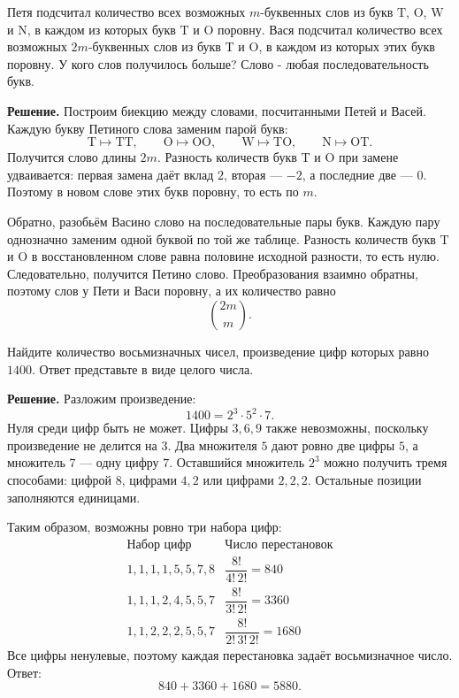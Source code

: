 \begin{problems}
\item Петя подсчитал количество всех возможных $m$-буквенных слов из букв $\mathrm{T}$, $\mathrm{O}$, $\mathrm{W}$ и $\mathrm{N}$, в каждом из которых букв $\mathrm{T}$ и $\mathrm{O}$ поровну. Вася подсчитал количество всех возможных $2m$-буквенных слов из букв $\mathrm{T}$ и $\mathrm{O}$, в каждом из которых этих букв поровну. У кого слов получилось больше? Слово - любая последовательность букв.
\par\smallskip\noindent\textbf{Решение.} Построим биекцию между словами, посчитанными Петей и Васей. Каждую букву Петиного слова заменим парой букв:
\[
\mathrm{T}\mapsto\mathrm{TT},\qquad
\mathrm{O}\mapsto\mathrm{OO},\qquad
\mathrm{W}\mapsto\mathrm{TO},\qquad
\mathrm{N}\mapsto\mathrm{OT}.
\]
Получится слово длины $2m$. Разность количеств букв $\mathrm{T}$ и $\mathrm{O}$ при замене удваивается: первая замена даёт вклад $2$, вторая --- $-2$, а последние две --- $0$. Поэтому в новом слове этих букв поровну, то есть по $m$.
\par Обратно, разобьём Васино слово на последовательные пары букв. Каждую пару однозначно заменим одной буквой по той же таблице. Разность количеств букв $\mathrm{T}$ и $\mathrm{O}$ в восстановленном слове равна половине исходной разности, то есть нулю. Следовательно, получится Петино слово. Преобразования взаимно обратны, поэтому слов у Пети и Васи поровну, а их количество равно
\[
\binom{2m}{m}.
\]\par

\item Найдите количество восьмизначных чисел, произведение цифр которых равно $1400$. Ответ представьте в виде целого числа.
\par\smallskip\noindent\textbf{Решение.} Разложим произведение:
\[
1400=2^3\cdot5^2\cdot7.
\]
Нуля среди цифр быть не может. Цифры $3,6,9$ также невозможны, поскольку произведение не делится на $3$. Два множителя $5$ дают ровно две цифры $5$, а множитель $7$ --- одну цифру $7$. Оставшийся множитель $2^3$ можно получить тремя способами: цифрой $8$, цифрами $4,2$ или цифрами $2,2,2$. Остальные позиции заполняются единицами.
\par Таким образом, возможны ровно три набора цифр:
\[
\begin{array}{c|c}
\text{Набор цифр}&\text{Число перестановок}\\ \hline
1,1,1,1,5,5,7,8 & \dfrac{8!}{4!\,2!}=840\\[0.8em]
1,1,1,2,4,5,5,7 & \dfrac{8!}{3!\,2!}=3360\\[0.8em]
1,1,2,2,2,5,5,7 & \dfrac{8!}{2!\,3!\,2!}=1680
\end{array}
\]
Все цифры ненулевые, поэтому каждая перестановка задаёт восьмизначное число. Ответ:
\[
840+3360+1680=5880.
\]\par


\end{problems}
